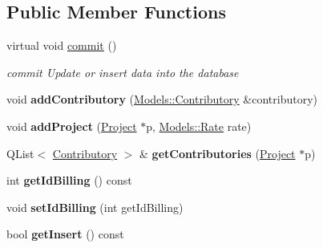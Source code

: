 \subsection*{Public Member Functions}
\begin{DoxyCompactItemize}
\item 
\hypertarget{classModels_1_1ContributoriesList_ad341e0527f4c9057281400f6cf54e54f}{virtual void \hyperlink{classModels_1_1ContributoriesList_ad341e0527f4c9057281400f6cf54e54f}{commit} ()}\label{classModels_1_1ContributoriesList_ad341e0527f4c9057281400f6cf54e54f}

\begin{DoxyCompactList}\small\item\em commit Update or insert data into the database \end{DoxyCompactList}\item 
\hypertarget{classModels_1_1ContributoriesList_a62b01d5292326da5902589ddb9b71234}{void {\bfseries add\-Contributory} (\hyperlink{classModels_1_1Contributory}{Models\-::\-Contributory} \&contributory)}\label{classModels_1_1ContributoriesList_a62b01d5292326da5902589ddb9b71234}

\item 
\hypertarget{classModels_1_1ContributoriesList_a4c99c890fc7d7616678d6e5f7ee558f5}{void {\bfseries add\-Project} (\hyperlink{classModels_1_1Project}{Project} $\ast$p, \hyperlink{classModels_1_1Rate}{Models\-::\-Rate} rate)}\label{classModels_1_1ContributoriesList_a4c99c890fc7d7616678d6e5f7ee558f5}

\item 
\hypertarget{classModels_1_1ContributoriesList_a2549547fd3866d879ebbfd1f38145fc5}{Q\-List$<$ \hyperlink{classModels_1_1Contributory}{Contributory} $>$ \& {\bfseries get\-Contributories} (\hyperlink{classModels_1_1Project}{Project} $\ast$p)}\label{classModels_1_1ContributoriesList_a2549547fd3866d879ebbfd1f38145fc5}

\item 
\hypertarget{classModels_1_1ContributoriesList_a3fbbce49ffcdbfa0693f4d21dd0d8c14}{int {\bfseries get\-Id\-Billing} () const }\label{classModels_1_1ContributoriesList_a3fbbce49ffcdbfa0693f4d21dd0d8c14}

\item 
\hypertarget{classModels_1_1ContributoriesList_a759f76db48c3dfe88ab8bd534b835553}{void {\bfseries set\-Id\-Billing} (int get\-Id\-Billing)}\label{classModels_1_1ContributoriesList_a759f76db48c3dfe88ab8bd534b835553}

\item 
\hypertarget{classModels_1_1ContributoriesList_ab5b32ef1b153af303852d10b0168a41f}{bool {\bfseries get\-Insert} () const }\label{classModels_1_1ContributoriesList_ab5b32ef1b153af303852d10b0168a41f}


\end{DoxyCompactItemize}
